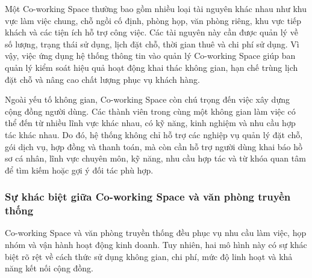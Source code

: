 Một Co-working Space thường bao gồm nhiều loại tài nguyên khác nhau như khu vực làm việc chung, chỗ ngồi cố định, phòng họp, văn phòng riêng, khu vực tiếp khách và các tiện ích hỗ trợ công việc. Các tài nguyên này cần được quản lý về số lượng, trạng thái sử dụng, lịch đặt chỗ, thời gian thuê và chi phí sử dụng. Vì vậy, việc ứng dụng hệ thống thông tin vào quản lý Co-working Space giúp ban quản lý kiểm soát hiệu quả hoạt động khai thác không gian, hạn chế trùng lịch đặt chỗ và nâng cao chất lượng phục vụ khách hàng.

Ngoài yếu tố không gian, Co-working Space còn chú trọng đến việc xây dựng cộng đồng người dùng. Các thành viên trong cùng một không gian làm việc có thể đến từ nhiều lĩnh vực khác nhau, có kỹ năng, kinh nghiệm và nhu cầu hợp tác khác nhau. Do đó, hệ thống không chỉ hỗ trợ các nghiệp vụ quản lý đặt chỗ, gói dịch vụ, hợp đồng và thanh toán, mà còn cần hỗ trợ người dùng khai báo hồ sơ cá nhân, lĩnh vực chuyên môn, kỹ năng, nhu cầu hợp tác và từ khóa quan tâm để tìm kiếm hoặc gợi ý đối tác phù hợp.

\subsubsection{Sự khác biệt giữa Co-working Space và văn phòng truyền thống}

Co-working Space và văn phòng truyền thống đều phục vụ nhu cầu làm việc, họp nhóm và vận hành hoạt động kinh doanh. Tuy nhiên, hai mô hình này có sự khác biệt rõ rệt về cách thức sử dụng không gian, chi phí, mức độ linh hoạt và khả năng kết nối cộng đồng.


